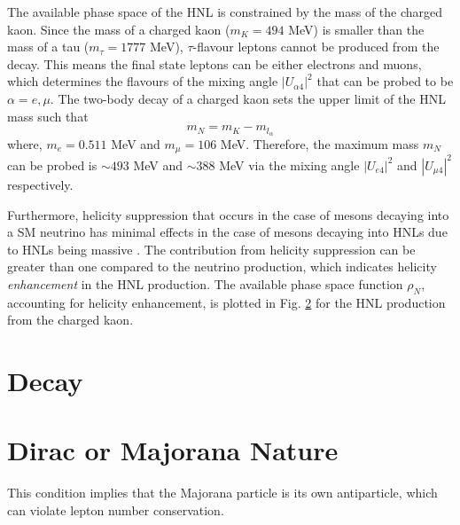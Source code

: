 The available phase space of the HNL is constrained by the mass of the charged kaon.
Since the mass of a charged kaon ($m_{K} = 494 $ MeV) is smaller than the mass of a tau ($m_{\tau}=1777 $ MeV), $\tau$-flavour leptons cannot be produced from the decay.  
This means the final state leptons can be either electrons and muons, which determines the flavours of the mixing angle $|U_{\alpha4}|^{2}$ that can be probed to be $\alpha = e, \mu$.
The two-body decay of a charged kaon sets the upper limit of the HNL mass such that
\begin{equation}
	m_{N} = m_{K} - m_{l_{\alpha}}
\end{equation}
where, $m_{e}= 0.511 $ MeV and $m_{\mu}= 106 $ MeV.
Therefore, the maximum mass $m_{N}$ can be probed is $\sim493$ MeV  and $\sim388$ MeV via the mixing angle $|U_{e4}|^{2}$ and $|U_{\mu4}|^{2}$ respectively.

Furthermore, helicity suppression that occurs in the case of mesons decaying into a SM neutrino has minimal effects in the case of mesons decaying into HNLs due to HNLs being massive \cite{}.
The contribution from helicity suppression can be greater than one compared to the neutrino production, which indicates helicity \textit{enhancement} in the HNL production.
The available phase space function $\rho_{N}$, accounting for helicity enhancement, is plotted in Fig. \ref{} for the HNL production from the charged kaon. 


\section{Decay}







\section{Dirac or Majorana Nature}

This condition implies that the Majorana particle is its own antiparticle, which can violate lepton number conservation.

